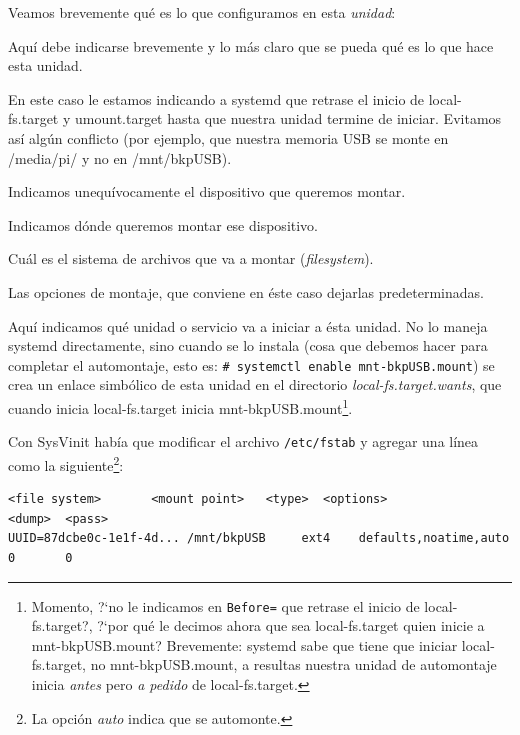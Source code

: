\documentclass[10pt,a4paper]{article}
\begin{document}
Veamos brevemente qu\'e es lo que configuramos en esta \emph{unidad}:

\begin{description}
\label{sec:wantedBy}
    \item [Description=] Aqu\'i debe indicarse brevemente y lo m\'as claro que se pueda qu\'e es lo que hace esta unidad.
    \item [Before=] En este caso le estamos indicando a systemd que retrase el inicio de local-fs.target y umount.target hasta que nuestra unidad termine de iniciar. Evitamos as\'i alg\'un conflicto (por ejemplo, que nuestra memoria USB se monte en /media/pi/ y no en /mnt/bkpUSB).\\
    \item [What=] Indicamos unequ\'ivocamente el dispositivo que queremos montar.
    \item [Where=] Indicamos d\'onde queremos montar ese dispositivo.
    \item [Type=] Cu\'al es el sistema de archivos que va a montar (\emph{filesystem}).
    \item [Options=] Las opciones de montaje, que conviene en \'este caso dejarlas predeterminadas.
    \item [WantedBy=] Aqu\'i indicamos qu\'e unidad o servicio va a iniciar a \'esta unidad. No lo maneja systemd directamente, sino cuando se lo instala (cosa que debemos hacer para completar el automontaje, esto es: \lstinline{# systemctl enable mnt-bkpUSB.mount}) se crea un enlace simb\'olico de esta unidad en el directorio \emph{local-fs.target.wants}, que cuando inicia local-fs.target inicia mnt-bkpUSB.mount\footnote{Momento, ?`no le indicamos en \texttt{Before=} que retrase el inicio de local-fs.target?, ?`por qu\'e le decimos ahora que sea local-fs.target quien inicie a mnt-bkpUSB.mount? Brevemente: systemd sabe que tiene que iniciar local-fs.target, no mnt-bkpUSB.mount, a resultas nuestra unidad de automontaje inicia \emph{antes} pero \emph{a pedido} de local-fs.target.}.
\end{description}

Con SysVinit hab\'ia que modificar el archivo \texttt{/etc/fstab} y agregar una l\'inea como la siguiente\footnote{La opci\'on \emph{auto} indica que se automonte.}:

\begin{scriptsize}
\begin{mdframed}
\begin{verbatim}
<file system>       <mount point>   <type>  <options>               <dump>  <pass>
UUID=87dcbe0c-1e1f-4d... /mnt/bkpUSB     ext4    defaults,noatime,auto   0       0
\end{verbatim}
\end{mdframed}
\end{scriptsize}
\end{document}
